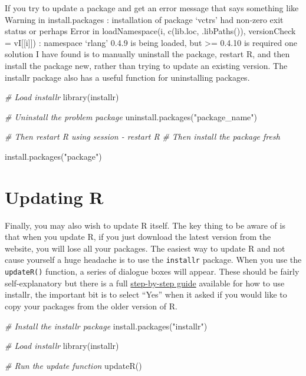 \documentclass[
]{book}
\newenvironment{Shaded}{\begin{snugshade}}{\end{snugshade}}
\newcommand{\CommentTok}[1]{\textcolor[rgb]{0.56,0.35,0.01}{\textit{#1}}}
\newcommand{\FunctionTok}[1]{\textcolor[rgb]{0.00,0.00,0.00}{#1}}
\newcommand{\NormalTok}[1]{#1}
\newcommand{\StringTok}[1]{\textcolor[rgb]{0.31,0.60,0.02}{#1}}
\begin{document}
If you try to update a package and get an error message that says something like Warning in install.packages : installation of package `vctrs' had non-zero exit status or perhaps Error in loadNamespace(i, c(lib.loc, .libPaths()), versionCheck = vI{[}{[}i{]}{]}) : namespace `rlang' 0.4.9 is being loaded, but \textgreater= 0.4.10 is required one solution I have found is to manually uninstall the package, restart R, and then install the package new, rather than trying to update an existing version. The installr package also has a useful function for uninstalling packages.

\begin{Shaded}
\begin{Highlighting}[]
\CommentTok{\# Load installr}
\FunctionTok{library}\NormalTok{(installr)}

\CommentTok{\# Uninstall the problem package}
\FunctionTok{uninstall.packages}\NormalTok{(}\StringTok{"package\_name"}\NormalTok{)}

\CommentTok{\# Then restart R using session {-} restart R}
\CommentTok{\# Then install the package fresh}

\FunctionTok{install.packages}\NormalTok{(}\StringTok{"package"}\NormalTok{)}
\end{Highlighting}
\end{Shaded}

\hypertarget{updating-r}{%
\section{Updating R}\label{updating-r}}

Finally, you may also wish to update R itself. The key thing to be aware of is that when you update R, if you just download the latest version from the website, you will lose all your packages. The easiest way to update R and not cause yourself a huge headache is to use the \texttt{installr} package. When you use the \texttt{updateR()} function, a series of dialogue boxes will appear. These should be fairly self-explanatory but there is a full \href{https://www.r-statistics.com/2015/06/a-step-by-step-screenshots-tutorial-for-upgrading-r-on-windows/}{step-by-step guide} available for how to use installr, the important bit is to select ``Yes'' when it asked if you would like to copy your packages from the older version of R.

\begin{Shaded}
\begin{Highlighting}[]
\CommentTok{\# Install the installr package}
\FunctionTok{install.packages}\NormalTok{(}\StringTok{"installr"}\NormalTok{)}

\CommentTok{\# Load installr}
\FunctionTok{library}\NormalTok{(installr)}

\CommentTok{\# Run the update function}
\FunctionTok{updateR}\NormalTok{()}
\end{Highlighting}
\end{Shaded}
\end{document}

